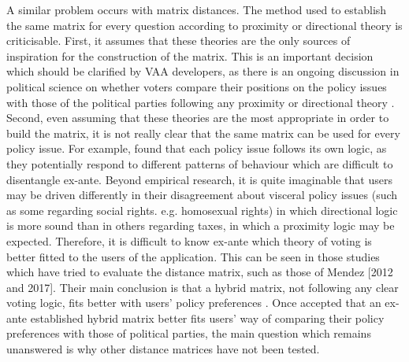 \documentclass{scrartcl}
\begin{document}
A similar problem occurs with matrix distances. The method used to establish the same matrix for every question according to proximity or directional theory is criticisable. First, it assumes that these theories are the only sources of inspiration for the construction of the matrix. This is an important decision which should be clarified by VAA developers, as there is an ongoing discussion in political science on whether voters compare their positions on the policy issues with those of the political parties following any proximity or directional theory \cite{dinas2016dead}. Second, even assuming that these theories are the most appropriate in order to build the matrix, it is not really clear that the same matrix can be used for every policy issue. For example, \cite{kropko2018issue} found that each policy issue follows its own logic, as they potentially respond to different patterns of behaviour which are difficult to disentangle ex-ante. Beyond empirical research, it is quite imaginable that users may be driven differently in their disagreement about visceral policy issues (such as some  regarding social rights. e.g. homosexual rights) in which directional logic is more sound than in others regarding taxes, in which a proximity logic may be expected. Therefore, it is difficult to know ex-ante which theory of voting is better fitted to the users of the application. This can be seen in those studies which have tried to evaluate the distance matrix, such as those of Mendez [2012 and 2017]. Their main conclusion is that a hybrid matrix, not following any clear voting logic, fits better with users' policy preferences \cite{Mendez2017}. Once accepted that an ex-ante established hybrid matrix better fits users' way of comparing their policy preferences with those of political parties, the main question which remains unanswered is why other distance matrices have not been tested.
\\
\end{document}
